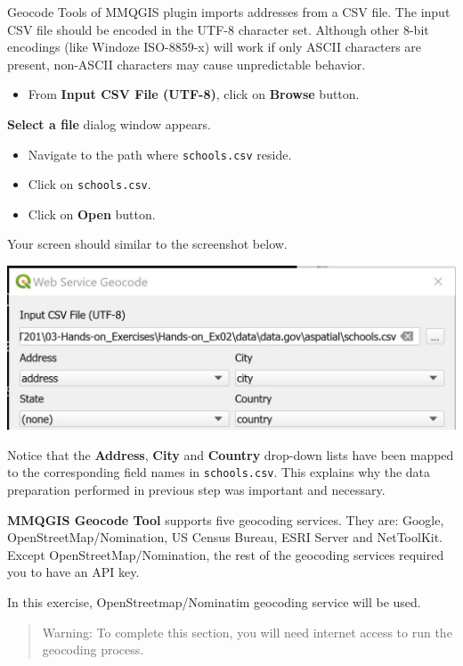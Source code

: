\documentclass[
  letterpaper,
  DIV=11,
  numbers=noendperiod]{scrreprt}
\providecommand{\tightlist}{%
  \setlength{\itemsep}{0pt}\setlength{\parskip}{0pt}}\usepackage{longtable,booktabs,array}
\begin{document}
Geocode Tools of MMQGIS plugin imports addresses from a CSV file. The
input CSV file should be encoded in the UTF-8 character set. Although
other 8-bit encodings (like Windoze ISO-8859-x) will work if only ASCII
characters are present, non-ASCII characters may cause unpredictable
behavior.

\begin{itemize}
\tightlist
\item
  From \textbf{Input CSV File (UTF-8)}, click on \textbf{Browse} button.
\end{itemize}

\textbf{Select a file} dialog window appears.

\begin{itemize}
\tightlist
\item
  Navigate to the path where \texttt{schools.csv} reside.
\item
  Click on \texttt{schools.csv}.
\item
  Click on \textbf{Open} button.
\end{itemize}

Your screen should similar to the screenshot below.

\includegraphics{./img02/image21.jpg}

Notice that the \textbf{Address}, \textbf{City} and \textbf{Country}
drop-down lists have been mapped to the corresponding field names in
\texttt{schools.csv}. This explains why the data preparation performed
in previous step was important and necessary.

\textbf{MMQGIS Geocode Tool} supports five geocoding services. They are:
Google, OpenStreetMap/Nomination, US Census Bureau, ESRI Server and
NetToolKit. Except OpenStreetMap/Nomination, the rest of the geocoding
services required you to have an API key.

In this exercise, OpenStreetmap/Nominatim geocoding service will be
used.

\begin{quote}
Warning: To complete this section, you will need internet access to run
the geocoding process.
\end{quote}
\end{document}
